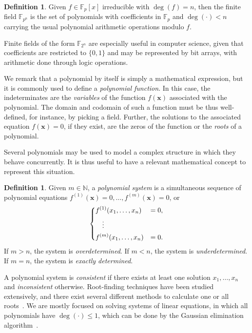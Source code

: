 \documentclass[12pt, a4paper, oneside]{memoir}
\theoremstyle{definition}
\newtheorem{definition}[theorem]{Definition}
\begin{document}
\begin{definition}
  Given $f \in \mathbb{F}_{p}[x]$ irreducible with $\deg(f) = n$, then the finite field $\mathbb{F}_{p^{n}}$ is the set of polynomials with coefficients in $\mathbb{F}_{p}$ and $\deg(\cdot) < n$ carrying the usual polynomial arithmetic operations modulo $f$.
\end{definition}

Finite fields of the form $\mathbb{F}_{2^{n}}$ are especially useful in computer science, given that coefficients are restricted to $\{0, 1\}$ and may be represented by bit arrays, with arithmetic done through logic operations.

We remark that a polynomial by itself is simply a mathematical expression, but it is commonly used to define a \emph{polynomial function}. In this case, the indeterminates are the \emph{variables} of the function $f(\mathbf{x})$ associated with the polynomial. The domain and codomain of such a function must be thus well-defined, for instance, by picking a field. Further, the solutions to the associated equation $f(\mathbf{x}) = 0$, if they exist, are the zeros of the function or the \emph{roots} of a polynomial. 

Several polynomials may be used to model a complex structure in which they behave concurrently. It is thus useful to have a relevant mathematical concept to represent this situation.

\begin{definition}\label{def:poly-sys}
  Given $m \in \mathbb{N}$, a \emph{polynomial system} is a simultaneous sequence of polynomial equations $f^{(1)}(\mathbf{x}) = 0, \dots, f^{(m)}(\mathbf{x}) = 0$, or
  \begin{align}
    \begin{dcases}
      f^{(1)}(x_{1}, \dots, x_{n}) &= 0, \\
      \quad \vdots \\
      f^{(m)}(x_{1}, \dots, x_{n}) &= 0.
    \end{dcases}
  \end{align}
  If $m > n$, the system is \emph{overdetermined}. If $m < n$, the system is \emph{underdetermined}. If $m = n$, the system is \emph{exactly determined}.
\end{definition}

A polynomial system is \emph{consistent} if there exists at least one solution $x_{1}, \dots, x_{n}$ and \emph{inconsistent} otherwise. Root-finding techniques have been studied extensively, and there exist several different methods to calculate one or all roots~\cite[Chap.~9]{Press:2007}. We are mostly focused on solving systems of linear equations, in which all polynomials have $\deg(\cdot) \leq 1$, which can be done by the Gaussian elimination algorithm~\cite[Sec.~2.2]{Press:2007}.
\end{document}
